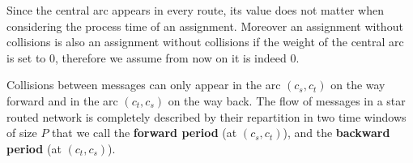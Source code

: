 \documentclass[10pt, conference, letterpaper]{IEEEtran}
\begin{document}
      Since the central arc appears in every route, its value does not matter when considering the process time of an assignment.
      Moreover an assignment without collisions is also an assignment without collisions if the weight of the central arc 
      is set to $0$, therefore we assume from now on it is indeed $0$.
      
      
      Collisions between messages can only appear in the arc $(c_s,c_t)$ on the way forward and in the arc $(c_t,c_s)$ on the way back. The flow of messages in a star routed network is completely described by their repartition in two time windows of size $P$ that we call the {\bf forward period} (at $(c_s,c_t)$), and the {\bf backward period} (at $(c_t,c_s)$).

%      
%
%      
%
%
%  
%          
%
%
%
%
%  
\end{document}
